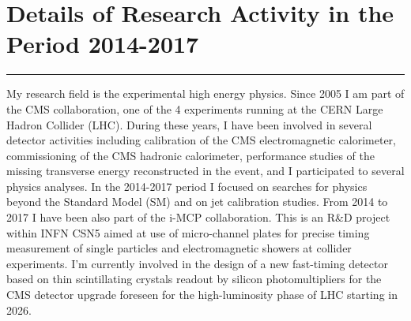 \documentclass[10pt, a4paper]{article}
\begin{document}
\section*{Details of Research Activity in the Period 2014-2017}
\vspace{-5pt}
\hrule
\vspace{10pt}
My research field is the experimental high energy physics. Since 2005
I am part of the CMS collaboration, one of the 4 experiments running at
the CERN Large Hadron Collider (LHC). During these years, I have been
involved in several detector activities including calibration of the
CMS electromagnetic calorimeter, commissioning of the CMS hadronic
calorimeter, performance studies of the missing transverse energy
reconstructed in the event, and I participated to several physics analyses.
In the 2014-2017 period I focused on searches for physics beyond the
Standard Model (SM) and on jet calibration studies. 
From 2014 to 2017 I have been also part of the i-MCP collaboration. This is
an R\&D project within INFN CSN5 aimed at use of micro-channel plates for
precise timing measurement of single particles and electromagnetic showers
at collider experiments. I'm currently involved in the design of a
new fast-timing detector based on thin scintillating crystals readout by 
silicon photomultipliers for the CMS detector upgrade foreseen for 
the high-luminosity phase of LHC starting in 2026. \\[1em]
\end{document}
